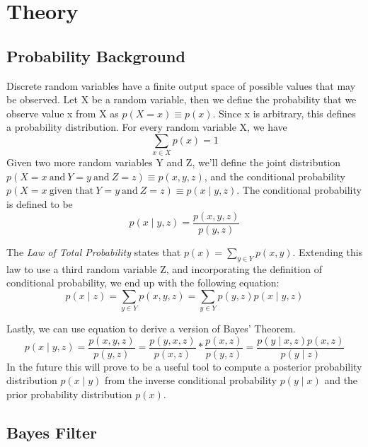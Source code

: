 \chapter{Theory}


\section{Probability Background}
Discrete random variables have a finite output space of possible values that may be observed. Let X be a random variable, then we define the probability that we observe value x from X as \( p(X = x) \equiv p(x)\). Since x is arbitrary, this defines a probability distribution. For every random variable X, we have
\begin{equation*}
\sum\limits_{x \in X} p(x) = 1
\end{equation*}
Given two more random variables Y and Z, we'll define the joint distribution \(p(X=x\ \textrm{and}\ Y=y\ \textrm{and}\ Z=z) \equiv p(x,y,z)\), and the conditional probability \(p(X=x\ \textrm{given that}\ Y=y\ \textrm{and}\ Z=z) \equiv p(x \mathbin{\vert} y,z)\). The conditional probability is defined to be
\begin{equation} \label{eqCondProb}
p(x \mathbin{\vert} y,z) = \frac{p(x,y,z)}{p(y,z)}
\end{equation}

The \textit{Law of Total Probability} states that \(p(x) = \sum\limits_{y \in Y} p(x,y)\). Extending this law to use a third random variable Z, and incorporating the definition of conditional probability, we end up with the following equation:
\begin{equation} \label{eqTotalProb}
p(x \mathbin{\vert} z) = \sum\limits_{y \in Y} p(x,y,z)
= \sum\limits_{y \in Y} p(y,z)p(x \mathbin{\vert} y,z)
\end{equation}

Lastly, we can use equation  to derive a version of Bayes' Theorem. 
\begin{equation} \label{eqBayesThm}
p(x \mathbin{\vert} y,z) = \frac{p(x,y,z)}{p(y,z)} = \frac{p(y,x,z)}{p(x,z)} * \frac{p(x,z)}{p(y,z)} = \frac{p(y \mathbin{\vert} x,z)p(x,z)}{p(y \mathbin{\vert} z)}
\end{equation}
In the future this will prove to be a useful tool to compute a posterior probability distribution \(p(x \mathbin{\vert} y)\) from the inverse conditional probability \(p(y \mathbin{\vert} x)\) and the prior probability distribution \(p(x)\).

\section{Bayes Filter}

